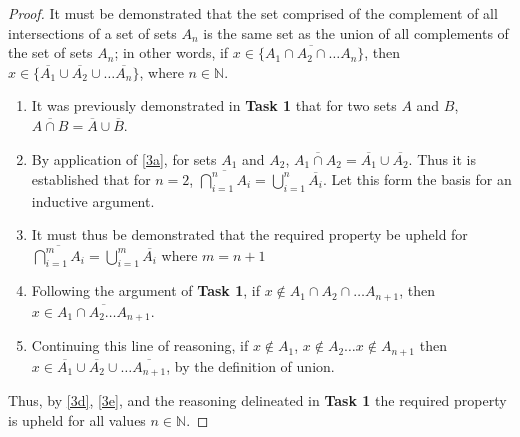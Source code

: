 \begin{proof}
	It must be demonstrated that the set comprised of the complement of all intersections of a set of sets $A_n$ is the same set as the union of all complements of the set of sets $A_n$; in other words, if $x \in \overline{\{A_1 \cap A_2 \cap \ldots A_n\}}$, then $ x \in \{\overline{A_1} \cup \overline{A_2} \cup \ldots \overline{A_n}\}$, where $n \in \mathbb{N}$.
	\begin{enumerate}[label=\textbf{\Roman*}]
		\item \label{3a} It was previously demonstrated in \textbf{Task 1} that for two sets $A$ and $B$, $\overline{A \cap B} = \overline{A} \cup \overline{B}$.
		\item \label{3b} By application of \ref{3a}, for sets $A_1$ and $A_2$, $\overline{A_1 \cap A_2} = \overline{A_1} \cup \overline{A_2}$. Thus it is established that for $n=2$, $ \overline{\bigcap_{i=1}^{n} A_i} = \bigcup_{i=1}^{n} \overline{A_i}$. Let this form the basis for an inductive argument.
		\item \label{3c} It must thus be demonstrated that the required property be upheld for $ \overline{\bigcap_{i=1}^{m} A_i} = \bigcup_{i=1}^{m} \overline{A_i}$ where $m=n+1$
		\item \label{3d} Following the argument of \textbf{Task 1}, if $x \notin A_1 \cap A_2 \cap \ldots A_{n+1}$, then $x \in \overline{A_1 \cap A_2 \ldots A_{n+1}}$.
		\item \label{3e} Continuing this line of reasoning, if $x \notin A_1$, $x \notin A_2 \ldots x \notin A_{n+1} $ then $x \in \overline{A_1} \cup \overline{A_2} \cup \ldots \overline{A_{n+1}}$, by the definition of union.
	\end{enumerate}
	Thus, by \ref{3d}, \ref{3e}, and the reasoning delineated in \textbf{Task 1} the required property is upheld for all values $n \in \mathbb{N}$.
\end{proof}